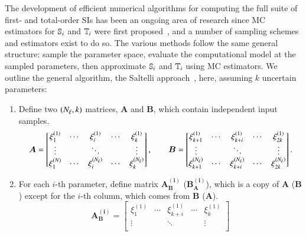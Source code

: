 The development of efficient numerical algorithms for computing the full suite of first- and total-order SIs has been an ongoing area of research since MC estimators for $\S{i}$ and $\T{i}$ were first proposed~\cite{sobol-1993, homma-saltelli-1996, saltelli-2002}, and a number of sampling schemes and estimators exist to do so.
The various methods follow the same general structure: sample the parameter space, evaluate the computational model at the sampled parameters, then approximate $\S{i}$ and $\T{i}$ using MC estimators. 
We outline the general algorithm, the Saltelli approach~\cite{saltelli-etal-2010, saltelli-2002}, here, assuming $k$ uncertain parameters:
\begin{enumerate}
    \item Define two $(\Nxi,k)$ matrices, $\bm{A}$ and $\bm{B}$, which contain independent input samples. 
    \begin{equation}\label{m2eq:Amatrix}
        \bm{A} = \begin{bmatrix}
        \xi_1^{(1)} & \cdots & \xi_i^{(1)}   & \cdots & \xi_k^{(1)}  \\
        \vdots      &        & \ddots        &        & \vdots       \\
        \xi_1^{(N)} & \cdots & \xi_i^{(\Nxi)}   & \cdots & \xi_k^{(\Nxi)}  \\
        \end{bmatrix} 
        , \quad \quad
        \bm{B} = \begin{bmatrix}
        \xi_{k+1}^{(1)} & \cdots & \xi_{k+i}^{(1)}   & \cdots & \xi_{2k}^{(1)}   \\
        \vdots          &        & \ddots            &        & \vdots           \\
        \xi_{k+1}^{(\Nxi)} & \cdots & \xi_{k+i}^{(\Nxi)}   & \cdots & \xi_{2k}^{(\Nxi)}   \\
        \end{bmatrix} .
    \end{equation}
    \item For each $i$-th parameter, define matrix $\bm{A_B^{(i)}}$ ($\bm{B_A^{(i)}}$), which is a copy of $\bm{A}$ ($\bm{B}$) except for the $i$-th column, which comes from $\bm{B}$ ($\bm{A}$). 
    \begin{equation}\label{m2eq:ABmatrix}
        \bm{A_B^{(i)}} = \begin{bmatrix}
        \xi_1^{(1)} & \cdots & \xi_{k+i}^{(1)}   & \cdots & \xi_k^{(1)}  \\
        \vdots      &        & \ddots            &        & \vdots       \\

\end{bmatrix}
\end{equation}
\end{enumerate}
